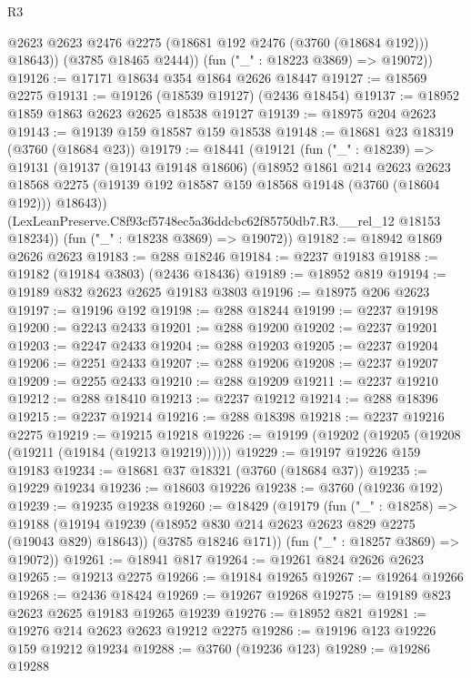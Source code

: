 \begin{lexlean}{R3}
\begin{coremodule}
            @2623
            @2623
            @2476
            @2275
            (@18681 @192 @2476 (@3760 (@18684 @192)))
            @18643))
        (@3785 @18465 @2444))
      (fun ("_" : @18223 @3869) => @19072))
@19126 := @17171 @18634 @354 @1864 @2626 @18447
@19127 := @18569 @2275
@19131 := @19126 (@18539 @19127) (@2436 @18454)
@19137 := @18952 @1859 @1863 @2623 @2625 @18538 @19127
@19139 := @18975 @204 @2623
@19143 := @19139 @159 @18587 @159 @18538
@19148 := @18681 @23 @18319 (@3760 (@18684 @23))
@19179 := @18441
    (@19121
      (fun ("_" : @18239) =>
      @19131
        (@19137
          (@19143 @19148 @18606)
          (@18952
            @1861
            @214
            @2623
            @2623
            @18568
            @2275
            (@19139 @192 @18587 @159 @18568 @19148 (@3760 (@18604 @192)))
            @18643))
        (LexLeanPreserve.C8f93cf5748ec5a36ddcbc62f85750db7.R3.__rel_12 @18153 @18234))
      (fun ("_" : @18238 @3869) => @19072))
@19182 := @18942 @1869 @2626 @2623
@19183 := @288 @18246
@19184 := @2237 @19183
@19188 := @19182 (@19184 @3803) (@2436 @18436)
@19189 := @18952 @819
@19194 := @19189 @832 @2623 @2625 @19183 @3803
@19196 := @18975 @206 @2623
@19197 := @19196 @192
@19198 := @288 @18244
@19199 := @2237 @19198
@19200 := @2243 @2433
@19201 := @288 @19200
@19202 := @2237 @19201
@19203 := @2247 @2433
@19204 := @288 @19203
@19205 := @2237 @19204
@19206 := @2251 @2433
@19207 := @288 @19206
@19208 := @2237 @19207
@19209 := @2255 @2433
@19210 := @288 @19209
@19211 := @2237 @19210
@19212 := @288 @18410
@19213 := @2237 @19212
@19214 := @288 @18396
@19215 := @2237 @19214
@19216 := @288 @18398
@19218 := @2237 @19216 @2275
@19219 := @19215 @19218
@19226 := @19199 (@19202 (@19205 (@19208 (@19211 (@19184 (@19213 @19219))))))
@19229 := @19197 @19226 @159 @19183
@19234 := @18681 @37 @18321 (@3760 (@18684 @37))
@19235 := @19229 @19234
@19236 := @18603 @19226
@19238 := @3760 (@19236 @192)
@19239 := @19235 @19238
@19260 := @18429
    (@19179
      (fun ("_" : @18258) =>
      @19188
        (@19194 @19239 (@18952 @830 @214 @2623 @2623 @829 @2275 (@19043 @829) @18643))
        (@3785 @18246 @171))
      (fun ("_" : @18257 @3869) => @19072))
@19261 := @18941 @817
@19264 := @19261 @824 @2626 @2623
@19265 := @19213 @2275
@19266 := @19184 @19265
@19267 := @19264 @19266
@19268 := @2436 @18424
@19269 := @19267 @19268
@19275 := @19189 @823 @2623 @2625 @19183 @19265 @19239
@19276 := @18952 @821
@19281 := @19276 @214 @2623 @2623 @19212 @2275
@19286 := @19196 @123 @19226 @159 @19212 @19234
@19288 := @3760 (@19236 @123)
@19289 := @19286 @19288

\end{coremodule}
\end{lexlean}
